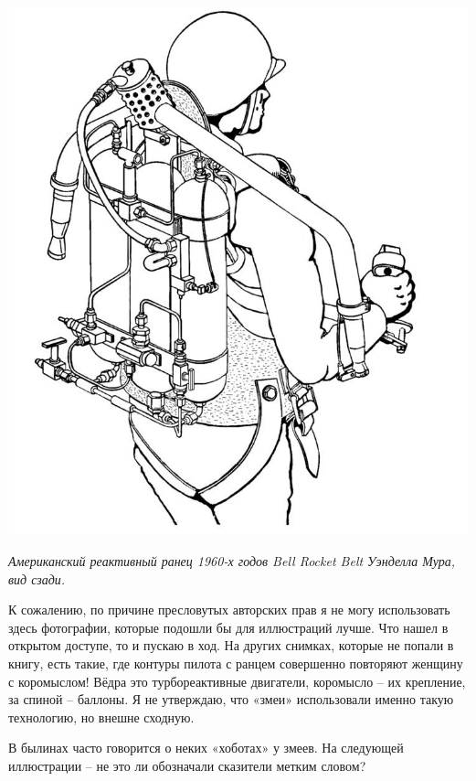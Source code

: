 \begin{center}
\includegraphics[width=0.86\linewidth]{chast-zmiy/ktotakiezmei/rocketpack_general_view.jpg}

\textit{Американский реактивный ранец 1960-х годов Bell Rocket Belt Уэнделла Мура, вид сзади.}
\end{center}

К сожалению, по причине пресловутых авторских прав я не могу использовать здесь фотографии, которые подошли бы для иллюстраций лучше. Что нашел в открытом доступе, то и пускаю в ход. На других снимках, которые не попали в книгу, есть такие, где контуры пилота с ранцем совершенно повторяют женщину с коромыслом! Вёдра это турбореактивные двигатели, коромысло – их крепление, за спиной – баллоны. Я не утверждаю, что «змеи» использовали именно такую технологию, но внешне сходную.

\newpage

В былинах часто говорится о неких «хоботах» у змеев. На следующей иллюстрации – не это ли обозначали сказители метким словом?

